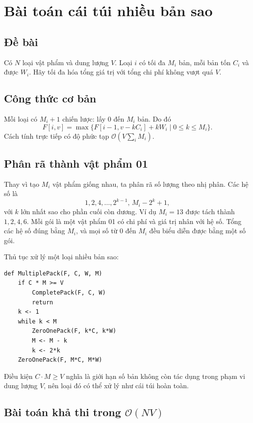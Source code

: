 \documentclass[11pt]{article}
\newcommand{\Oh}{\mathcal{O}}
\begin{document}
\section{Bài toán cái túi nhiều bản sao}

\subsection{Đề bài}

Có \(N\) loại vật phẩm và dung lượng \(V\). Loại \(i\) có tối đa \(M_i\) bản,
mỗi bản tốn \(C_i\) và được \(W_i\). Hãy tối đa hóa tổng giá trị với tổng chi
phí không vượt quá \(V\).

\subsection{Công thức cơ bản}

Mỗi loại có \(M_i+1\) chiến lược: lấy \(0\) đến \(M_i\) bản. Do đó
\[
  F[i,v]=
  \max\{F[i-1,v-kC_i]+kW_i\mid 0\le k\le M_i\}.
\]
Cách tính trực tiếp có độ phức tạp \(\Oh(V\sum_i M_i)\).

\subsection{Phân rã thành vật phẩm 01}

Thay vì tạo \(M_i\) vật phẩm giống nhau, ta phân rã số lượng theo nhị phân.
Các hệ số là
\[
  1,2,4,\ldots,2^{k-1},\,M_i-2^k+1,
\]
với \(k\) lớn nhất sao cho phần cuối còn dương. Ví dụ \(M_i=13\) được tách
thành \(1,2,4,6\). Mỗi gói là một vật phẩm 01 có chi phí và giá trị nhân với
hệ số. Tổng các hệ số đúng bằng \(M_i\), và mọi số từ \(0\) đến \(M_i\) đều
biểu diễn được bằng một số gói.

Thủ tục xử lý một loại nhiều bản sao:
\begin{verbatim}
def MultiplePack(F, C, W, M)
    if C * M >= V
        CompletePack(F, C, W)
        return
    k <- 1
    while k < M
        ZeroOnePack(F, k*C, k*W)
        M <- M - k
        k <- 2*k
    ZeroOnePack(F, M*C, M*W)
\end{verbatim}

Điều kiện \(C\cdot M\ge V\) nghĩa là giới hạn số bản không còn tác dụng trong
phạm vi dung lượng \(V\), nên loại đó có thể xử lý như cái túi hoàn toàn.

\subsection{Bài toán khả thi trong \texorpdfstring{\(\Oh(NV)\)}{O(NV)}}
\end{document}
